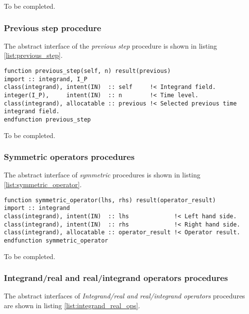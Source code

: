 \documentclass[pdftex,preprint,3p,times,numbers]{elsarticle}
\begin{document}
{\color{red} To be completed.}

\subsubsection{Previous step procedure}

The abstract interface of the \emph{previous step} procedure is shown in listing \ref{list:previous_step}.

\begin{lstlisting}[firstnumber=1,style=code,caption={previous step procedure interface},label={list:previous_step}]
function previous_step(self, n) result(previous)
import :: integrand, I_P
class(integrand), intent(IN)  :: self     !< Integrand field.
integer(I_P),     intent(IN)  :: n        !< Time level.
class(integrand), allocatable :: previous !< Selected previous time integrand field.
endfunction previous_step
\end{lstlisting}

{\color{red} To be completed.}

\subsubsection{Symmetric operators procedures}

The abstract interface of \emph{symmetric} procedures is shown in listing \ref{list:symmetric_operator}.

\begin{lstlisting}[firstnumber=1,style=code,caption={symmetric operator procedure interface},label={list:symmetric_operator}]
function symmetric_operator(lhs, rhs) result(operator_result)
import :: integrand
class(integrand), intent(IN)  :: lhs             !< Left hand side.
class(integrand), intent(IN)  :: rhs             !< Right hand side.
class(integrand), allocatable :: operator_result !< Operator result.
endfunction symmetric_operator
\end{lstlisting}

{\color{red} To be completed.}

\subsubsection{Integrand/real and real/integrand operators procedures}

The abstract interfaces of \emph{Integrand/real and real/integrand operators} procedures are shown in listing \ref{list:integrand_real_ops}.
\end{document}
